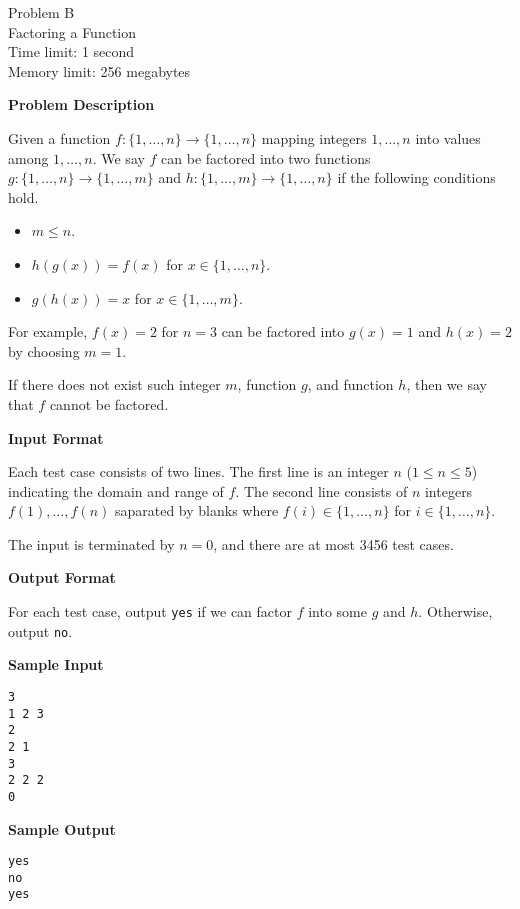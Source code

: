 \documentclass[11pt]{article}
\begin{document}
\begin{center}
    {\LARGE Problem B}\\
    {\Large Factoring a Function}\\
    {Time limit: 1 second}\\
    {Memory limit: 256 megabytes}
\end{center}

\textbf{\large Problem Description}

Given a function $f:\{1,\dots,n\}\rightarrow\{1,\dots,n\}$ mapping integers 
$1,\dots,n$ into values among $1,\dots,n$. We say $f$ can be factored
into two functions $g:\{1,\dots,n\}\rightarrow\{1,\dots,m\}$ and 
$h:\{1,\dots,m\}\rightarrow\{1,\dots,n\}$ if the following conditions hold.
\begin{itemize}
\item $m\le n$.
\item $h(g(x))=f(x)$ for $x\in\{1,\dots,n\}$.
\item $g(h(x))=x$ for $x\in\{1,\dots,m\}$.
\end{itemize}
For example, $f(x)=2$ for $n=3$ can be factored into $g(x)=1$ and $h(x)=2$ by
choosing $m=1$. 

If there does not exist such integer $m$, function $g$, and function $h$, then
we say that $f$ cannot be factored.



\textbf{\large Input Format}

Each test case consists of two lines. The first line is an integer $n$ 
($1\le n\le5$) indicating the domain and range of $f$. 
The second line consists of $n$
integers $f(1),\dots,f(n)$ saparated by blanks where $f(i)\in\{1,\dots,n\}$ for
$i\in\{1,\dots,n\}$.

The input is terminated by $n=0$, and there are at most 3456 test cases.

\textbf{\large Output Format}

For each test case, output \verb+yes+ if we can factor $f$ into some $g$ and 
$h$. Otherwise, output \verb+no+.

\textbf{\large Sample Input}

\begin{verbatim}
3
1 2 3
2
2 1
3
2 2 2
0
\end{verbatim}

\textbf{\large Sample Output}
\begin{verbatim}
yes
no
yes
\end{verbatim}
\end{document}
